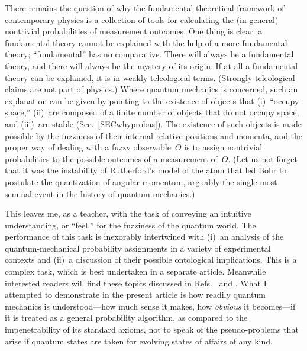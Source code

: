 \documentclass[12pt]{article}
\begin{document}
There remains the question of why the fundamental theoretical framework of contemporary physics is  a collection of tools for calculating the (in general) nontrivial probabilities of measurement outcomes. One thing is clear: a fundamental theory cannot be explained with the help of a more fundamental theory; ``fundamental'' has no comparative. There will always be a fundamental theory, and there will always be the mystery of its origin. If at all a fundamental theory can be explained, it is in weakly teleological terms. (Strongly teleological claims are not part of physics.) Where quantum mechanics is concerned, such an explanation can be given by pointing to the existence of objects that (i)~``occupy space,'' (ii)~are composed of a finite number of objects that do not occupy space, and (iii)~are stable (Sec.~\ref{SECwhyprobas}). The existence of such objects is made possible by the fuzziness of their internal relative positions and momenta, and the proper way of dealing with a fuzzy observable~$O$ is to assign nontrivial probabilities to the possible outcomes of a measurement of~$O$. (Let us not forget that it was the instability of Rutherford's model of the atom that led Bohr to postulate the quantization of angular momentum, arguably the single most seminal event in the history of quantum mechanics.)

This leaves me, as a teacher, with the task of conveying an intuitive understanding, or ``feel,'' for the fuzziness of the quantum world. The performance of this task is inexorably intertwined with (i)~an analysis of the quantum-mechanical probability assignments in a variety of experimental contexts and (ii)~a discussion of their possible ontological implications. This is a complex task, which is best undertaken in a separate article. Meanwhile interested readers will find these topics discussed in Refs.~\cite{Mohrhoff05} and \cite{Mohrhoff04}. What I attempted to demonstrate in the present article is how readily quantum mechanics is understood---how much sense it makes, how \textit{obvious} it becomes---if it is treated as a general probability algorithm, as compared to the impenetrability of its standard axioms, not to speak of the pseudo-problems that arise if quantum states are taken for evolving states of affairs of any kind.
\end{document}
